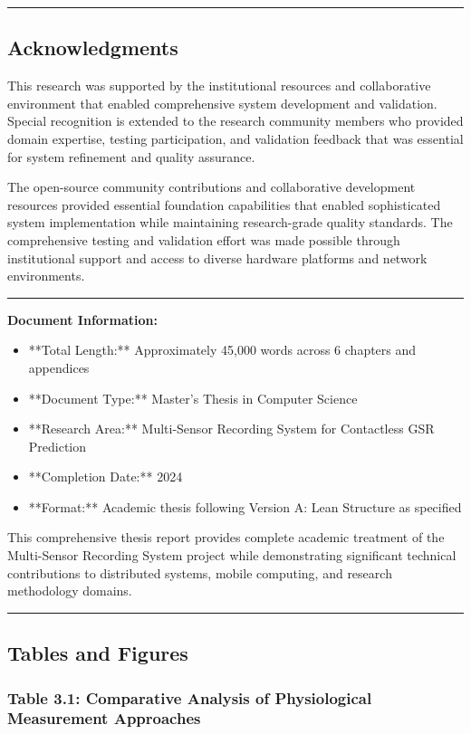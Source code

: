 \documentclass[12pt,a4paper]{report}
\begin{document}
\hrule

\subsection{Acknowledgments}

This research was supported by the institutional resources and collaborative environment that enabled comprehensive
system development and validation. Special recognition is extended to the research community members who provided domain
expertise, testing participation, and validation feedback that was essential for system refinement and quality
assurance.

The open-source community contributions and collaborative development resources provided essential foundation
capabilities that enabled sophisticated system implementation while maintaining research-grade quality standards. The
comprehensive testing and validation effort was made possible through institutional support and access to diverse
hardware platforms and network environments.

\hrule

\textbf{Document Information:}

\begin{itemize}
\item **Total Length:** Approximately 45,000 words across 6 chapters and appendices
\item **Document Type:** Master's Thesis in Computer Science
\item **Research Area:** Multi-Sensor Recording System for Contactless GSR Prediction
\item **Completion Date:** 2024
\item **Format:** Academic thesis following Version A: Lean Structure as specified

\end{itemize}
This comprehensive thesis report provides complete academic treatment of the Multi-Sensor Recording System project while
demonstrating significant technical contributions to distributed systems, mobile computing, and research methodology
domains.

\hrule

\subsection{Tables and Figures}

\subsubsection{Table 3.1: Comparative Analysis of Physiological Measurement Approaches}
\end{document}
